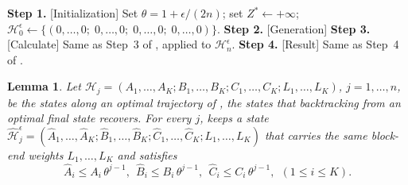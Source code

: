 \documentclass[12pt]{article}
\newtheorem{lemma}{Lemma}[section]
\begin{document}
\begin{sloppypar}
        \begin{algorithm}[H]
            \small
            \linespread{1.2}\selectfont
            \SetAlgoLined
            \DontPrintSemicolon
            \caption{State-class FPTAS for $F2 \parallel W C_{\max}$}\label{alg:fptas}
            \BlankLine
            \textbf{Step 1.} [Initialization] Set $\theta=1+\epsilon/(2n)$; set $Z^{*}\gets+\infty$; 
            $\mathscr{H}^{\epsilon}_{0}\gets\{(0,\dots,0; \; 0,\dots,0; \; 0,\dots,0; \; 0,\dots,0)\}$. \;
            \textbf{Step 2.} [Generation] 
            \textbf{Step 3.} [Calculate] Same as Step~3 of , applied to $\mathscr{H}^{\epsilon}_{n}$. \;
            \textbf{Step 4.} [Result] Same as Step~4 of . \;
        \end{algorithm}
        
        \begin{lemma}\label{lem:traj-approx}
            Let $\mathscr{H}_{j}=(A_1,\dots,A_K; B_1,\dots,B_K; C_1,\dots,C_K; L_1,\dots,L_K)$, $j=1,\dots,n$, be the
            states along an optimal trajectory of , the states that backtracking from an optimal
            final state recovers. For every $j$,  keeps a state
            $\hat{\mathscr{H}}^{\epsilon}_{j}=(\hat A_1,\dots,\hat A_K; \hat B_1,\dots,\hat B_K; \hat C_1,\dots,\hat C_K; L_1,\dots, L_K)$
            that carries the same block-end weights $L_1,\dots,L_K$ and satisfies
            \begin{equation}\label{eq:traj-bound}
                \hat A_i\le A_i\,\theta^{j-1},~~
                \hat B_i\le B_i\,\theta^{j-1},~~
                \hat C_i\le C_i\,\theta^{j-1},~~(1\le i\le K).
            \end{equation}
        \end{lemma}
        

\end{sloppypar}
\end{document}
